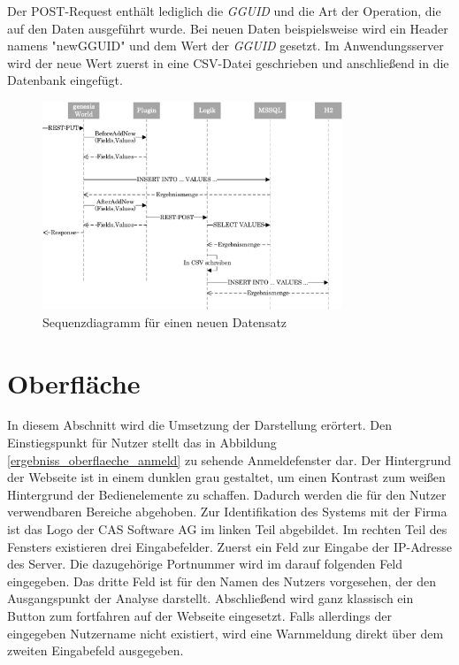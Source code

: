 Der POST-Request enthält lediglich die \textit{GGUID} und die Art der Operation, die auf den Daten ausgeführt wurde. Bei neuen Daten beispielsweise wird ein Header namens "newGGUID" und dem Wert der \textit{GGUID} gesetzt. Im Anwendungsserver wird der neue Wert zuerst in eine CSV-Datei geschrieben und anschließend in die Datenbank eingefügt.


\begin{figure}[htbp]
\centering
  \includegraphics[width=0.8\textwidth]{pics/sequenzdiagramm.pdf}
\caption{Sequenzdiagramm für einen neuen Datensatz}
\label{konzept_sequenz}
\end{figure}



\section{Oberfläche}

In diesem Abschnitt wird die Umsetzung der Darstellung erörtert. Den Einstiegspunkt für Nutzer stellt das in Abbildung \ref{ergebniss_oberflaeche_anmeld} zu sehende Anmeldefenster dar. Der Hintergrund der Webseite ist in einem dunklen grau gestaltet, um einen Kontrast zum weißen Hintergrund der Bedienelemente zu schaffen. Dadurch werden die für den Nutzer verwendbaren Bereiche abgehoben. Zur Identifikation des Systems mit der Firma ist das Logo der CAS Software AG im linken Teil abgebildet. Im rechten Teil des Fensters existieren drei Eingabefelder. Zuerst ein Feld zur Eingabe der IP-Adresse des Server. Die dazugehörige Portnummer wird im darauf folgenden Feld eingegeben. Das dritte Feld ist für den Namen des Nutzers vorgesehen, der den Ausgangspunkt der Analyse darstellt. Abschließend wird ganz klassisch ein Button zum fortfahren auf der Webseite eingesetzt. Falls allerdings der eingegeben Nutzername nicht existiert, wird eine Warnmeldung direkt über dem zweiten Eingabefeld ausgegeben. 

